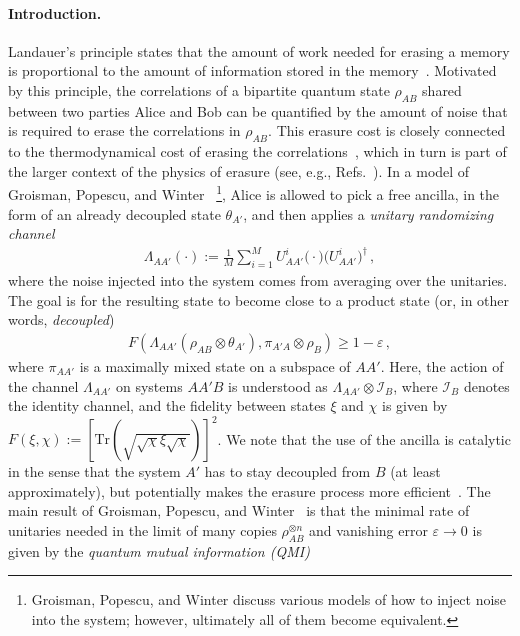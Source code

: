\documentclass[a4paper,aps,prl,twocolumn,10pt,superscriptaddress]{revtex4-1}
\theoremstyle{plain}
\theoremstyle{definition}
\begin{document}
\paragraph{Introduction.} Landauer's principle states that the amount of work needed for erasing a memory is proportional to the amount of information stored in the memory~\cite{L61}. Motivated by this principle, the correlations of a bipartite quantum state $\rho_{AB}$ shared between two parties Alice and Bob can be quantified by the amount of noise that is required to erase the correlations in $\rho_{AB}$. This erasure cost is closely connected to the thermodynamical cost of erasing the correlations~\cite{GPW05}, which in turn is part of the larger context of the physics of erasure (see, e.g., Refs.~\cite{faist2015minimal,Maruyama2009,plenio2001physics,berut2012experimental,faist2015minimal}). In a model of Groisman, Popescu, and Winter~\cite{GPW05} \footnote{Groisman, Popescu, and Winter discuss various models of how to inject noise into the system; however, ultimately all of them become equivalent.}, Alice is allowed to pick a free ancilla, in the form of an already decoupled state $\theta_{A'}$, and then applies a {\it unitary randomizing channel}
\begin{align}\label{eq:groisman1}
\Lambda_{AA'}(\cdot):=\frac{1}{M}\sum_{i=1}^MU^i_{AA'}\big(\cdot\big)\big(U^i_{AA'}\big)^\dagger\,,
\end{align}
where the noise injected into the system comes from averaging over the unitaries.
The goal is for the resulting state to become close to a product state (or, in other words, {\it decoupled})
\begin{align}\label{eq:groisman2}
F\left(\Lambda_{AA'}(\rho_{AB}\otimes\theta_{A'}),\pi_{A'A}\otimes\rho_B\right)\geq1-\varepsilon\,,
\end{align}
where $\pi_{AA'}$ is a maximally mixed state on a subspace of $AA'$. Here, the action of the channel $\Lambda_{AA'}$ on systems $AA'B$ is understood as $\Lambda_{AA'}\otimes\mathcal{I}_B$, where $\mathcal{I}_B$ denotes the identity channel, and the fidelity between states $\xi$ and $\chi$ is given by $F(\xi,\chi):=[\mathrm{Tr}(\sqrt{\sqrt{\chi}\xi\sqrt{\chi}})]^2$. We note that the use of the ancilla is catalytic in the sense that the system $A'$ has to stay decoupled from $B$ (at least approximately), but potentially makes the erasure process more efficient~\cite{MBDRC16}. The main result of Groisman, Popescu, and Winter~\cite[Thm.~1]{GPW05} is that the minimal rate of unitaries needed in the limit of many copies $\rho_{AB}^{\otimes n}$ and vanishing error $\varepsilon\to0$ is given by the {\it quantum mutual information (QMI)}
\end{document}
